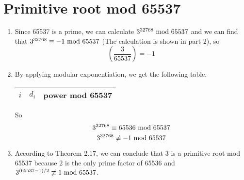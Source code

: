 \documentclass{article}
\renewcommand{\mod}{{\rm\ mod\ }}
\begin{document}
\section{Primitive root mod 65537}
\begin{enumerate}
\item
Since 65537 is a prime, we can calculate $3^{32768}\mod65537$ and we can find that $3^{32768}\equiv-1\mod65537$ (The calculation is shown in part 2), so $$\left(\frac{3}{65537}\right)=-1$$
\item
By applying modular exponentiation, we get the following table.
\begin{center}
\begin{tabular}{ccc}
$i$ & $d_i$ & power mod 65537 \\\hline

\end{tabular}
\end{center}

So $$3^{32768}\equiv65536\mod65537$$
$$3^{32768}\not\equiv-1\mod65537$$

\item
According to Theorem 2.17, we can conclude that 3 is a primitive root mod 65537 because 2 is the only prime factor of 65536 and $3^{(65537-1)/2}\not\equiv1\mod65537$.
\end{enumerate}
\end{document}
